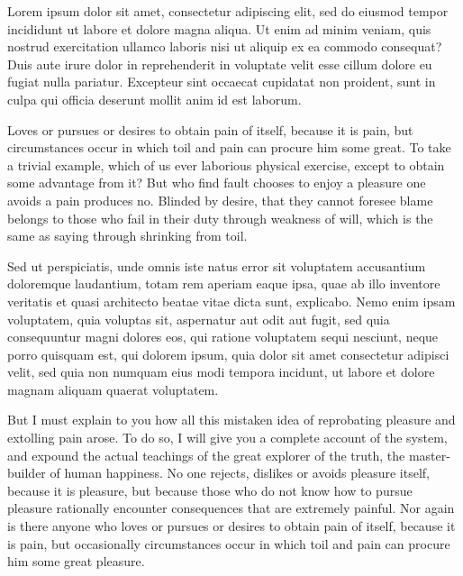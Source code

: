 \reviewersection

\setcounter{point}{-1}

\begin{point}
	Lorem ipsum dolor sit amet, consectetur adipiscing elit, sed do eiusmod tempor incididunt ut labore et dolore magna aliqua.
	Ut enim ad minim veniam, quis nostrud exercitation ullamco laboris nisi ut aliquip ex ea commodo consequat?
	Duis aute irure dolor in reprehenderit in voluptate velit esse cillum dolore eu fugiat nulla pariatur.
	Excepteur sint occaecat cupidatat non proident, sunt in culpa qui officia deserunt mollit anim id est laborum.
\end{point}
\begin{reply}
	Loves or pursues or desires to obtain pain of itself, because it is pain, but circumstances occur in which toil and pain can procure him some great.
	To take a trivial example, which of us ever laborious physical exercise, except to obtain some advantage from it?
	But who find fault chooses to enjoy a pleasure one avoids a pain produces no.
	Blinded by desire, that they cannot foresee blame belongs to those who fail in their duty through weakness of will, which is the same as saying through shrinking from toil.
\end{reply}

\begin{point}
	Sed ut perspiciatis, unde omnis iste natus error sit voluptatem accusantium doloremque laudantium, totam rem aperiam eaque ipsa, quae ab illo inventore veritatis et quasi architecto beatae vitae dicta sunt, explicabo.
	Nemo enim ipsam voluptatem, quia voluptas sit, aspernatur aut odit aut fugit, sed quia consequuntur magni dolores eos, qui ratione voluptatem sequi nesciunt, neque porro quisquam est, qui dolorem ipsum, quia dolor sit amet consectetur adipisci velit, sed quia non numquam eius modi tempora incidunt, ut labore et dolore magnam aliquam quaerat voluptatem.
\end{point}
\begin{reply}
	But I must explain to you how all this mistaken idea of reprobating pleasure and extolling pain arose.
	To do so, I will give you a complete account of the system, and expound the actual teachings of the great explorer of the truth, the master-builder of human happiness.
	No one rejects, dislikes or avoids pleasure itself, because it is pleasure, but because those who do not know how to pursue pleasure rationally encounter consequences that are extremely painful.
	Nor again is there anyone who loves or pursues or desires to obtain pain of itself, because it is pain, but occasionally circumstances occur in which toil and pain can procure him some great pleasure.
\end{reply}
